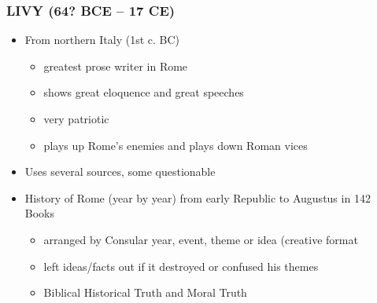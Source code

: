 \documentclass[12pt, twoside]{article}
\begin{document}
\subsubsection{LIVY (64? BCE – 17 CE)} 
\begin{itemize}
\item From northern Italy (1st c. BC)
	\begin{itemize}
	\item greatest prose writer in Rome
	\item shows great eloquence and great speeches
	\item very patriotic
	\item plays up Rome’s enemies and plays down Roman vices
	\end{itemize}
\item Uses several sources, some questionable
\item History of Rome (year by year) from early Republic to Augustus in 142 Books
	\begin{itemize}
	\item arranged by Consular year, event, theme or idea (creative format
	\item left ideas/facts out if it destroyed or confused his themes
	\item Biblical Historical Truth and Moral Truth
	\end{itemize}
\end{itemize}
\end{document}
